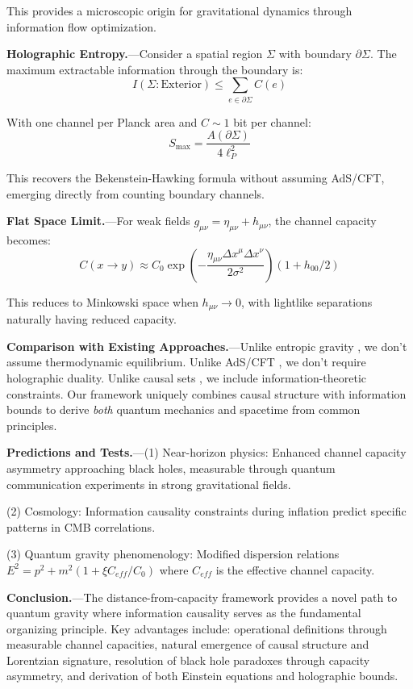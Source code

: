 \documentclass[aps,prl,twocolumn,showpacs,superscriptaddress,groupedaddress]{revtex4-2}
\begin{document}
This provides a microscopic origin for gravitational dynamics through information flow optimization.

\textbf{Holographic Entropy.}---Consider a spatial region $\Sigma$ with boundary $\partial\Sigma$. The maximum extractable information through the boundary is:
\begin{equation}
I(\Sigma : \text{Exterior}) \leq \sum_{e \in \partial\Sigma} C(e)
\end{equation}

With one channel per Planck area and $C \sim 1$ bit per channel:
\begin{equation}
S_{\max} = \frac{A(\partial\Sigma)}{4\ell_P^2}
\end{equation}

This recovers the Bekenstein-Hawking formula without assuming AdS/CFT, emerging directly from counting boundary channels.

\textbf{Flat Space Limit.}---For weak fields $g_{\mu\nu} = \eta_{\mu\nu} + h_{\mu\nu}$, the channel capacity becomes:
\begin{equation}
C(x \to y) \approx C_0 \exp\left(-\frac{\eta_{\mu\nu}\Delta x^\mu \Delta x^\nu}{2\sigma^2}\right)(1 + h_{00}/2)
\end{equation}

This reduces to Minkowski space when $h_{\mu\nu} \to 0$, with lightlike separations naturally having reduced capacity.

\textbf{Comparison with Existing Approaches.}---Unlike entropic gravity \cite{Verlinde2011}, we don't assume thermodynamic equilibrium. Unlike AdS/CFT \cite{Maldacena1998}, we don't require holographic duality. Unlike causal sets \cite{Sorkin2003}, we include information-theoretic constraints. Our framework uniquely combines causal structure with information bounds to derive \textit{both} quantum mechanics and spacetime from common principles.

\textbf{Predictions and Tests.}---(1) Near-horizon physics: Enhanced channel capacity asymmetry approaching black holes, measurable through quantum communication experiments in strong gravitational fields.

(2) Cosmology: Information causality constraints during inflation predict specific patterns in CMB correlations.

(3) Quantum gravity phenomenology: Modified dispersion relations $E^2 = p^2 + m^2(1 + \xi C_{eff}/C_0)$ where $C_{eff}$ is the effective channel capacity.

\textbf{Conclusion.}---The distance-from-capacity framework provides a novel path to quantum gravity where information causality serves as the fundamental organizing principle. Key advantages include: operational definitions through measurable channel capacities, natural emergence of causal structure and Lorentzian signature, resolution of black hole paradoxes through capacity asymmetry, and derivation of both Einstein equations and holographic bounds.
\end{document}
